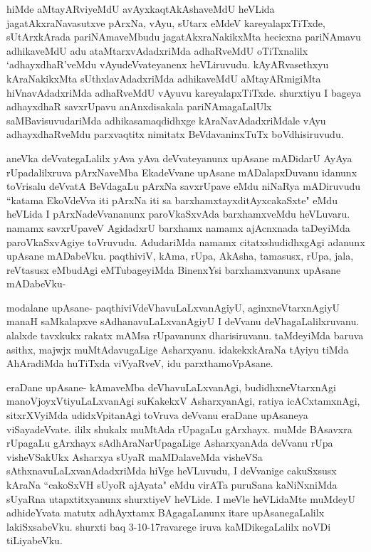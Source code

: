 \begin{artha}
hiMde aMtayARviyeMdU avAyxkaqtAkAshaveMdU heVLida jagatAkxraNavasutxve pArxNa, vAyu, sUtarx eMdeV kareyalapxTiTxde, sUtArxkArada pariNAmaveMbudu jagatAkxraNakikxMta hecicxna pariNAmavu adhikaveMdU adu ataMtarxvAdadxriMda adhaRveMdU oTiTxnalilx `adhayxdhaR'veMdu vAyudeVvateyanenx heVLiruvudu. kAyARvasethxyu kAraNakikxMta sUthxlavAdadxriMda adhikaveMdU aMtayARmigiMta hiVnavAdadxriMda adhaRveMdU vAyuvu kareyalapxTiTxde. shurxtiyu I bageya adhayxdhaR savxrUpavu anAnxdisakala pariNAmagaLalUlx saMBavisuvudariMda adhikasamaqdidhxge kAraNavAdadxriMdale vAyu adhayxdhaRveMdu parxvaqtitx nimitatx BeVdavaninxTuTx boVdhisiruvudu. 
\end{artha}

\begin{artha}
aneVka deVvategaLalilx yAva yAva deVvateyanunx upAsane mADidarU AyAya rUpadalilxruva pArxNaveMba EkadeVvane upAsane mADalapxDuvanu idanunx toVrisalu deVvatA BeVdagaLu pArxNa savxrUpave eMdu niNaRya mADiruvudu ``katama EkoVdeVva iti pArxNa iti sa barxhamxtayxditAyxcakaSxte" eMdu heVLida I pArxNadeVvananunx paroVkaSxvAda barxhamxveMdu heVLuvaru. namamx savxrUpaveV AgidadxrU barxhamx namamx ajAcnxnada taDeyiMda paroVkaSxvAgiye toVruvudu. AdudariMda namamx citatxshudidhxgAgi adanunx upAsane mADabeVku. paqthiviV, kAma, rUpa, AkAsha, tamasusx, rUpa, jala, reVtasusx eMbudAgi eMTubageyiMda BinenxYsi barxhamxvanunx upAsane mADabeVku-
\end{artha}

\begin{artha}
modalane upAsane- paqthiviVdeVhavuLaLxvanAgiyU, aginxneVtarxnAgiyU manaH saMkalapxve sAdhanavuLaLxvanAgiyU I deVvanu deVhagaLalilxruvanu. alalxde tavxkukx rakatx mAMsa rUpavanunx dharisiruvanu. taMdeyiMda baruva asithx, majwjx muMtAdavugaLige Asharxyanu. idakekxkAraNa tAyiyu tiMda AhAradiMda huTiTxda viVyaRveV, idu parxthamoVpAsane. 
\end{artha}

\begin{artha}
eraDane upAsane- kAmaveMba deVhavuLaLxvanAgi, budidhxneVtarxnAgi manoVjoyxVtiyuLaLxvanAgi suKakekxV AsharxyanAgi, ratiya icACxtamxnAgi, sitxrXVyiMda udidxVpitanAgi toVruva deVvanu eraDane upAsaneya viSayadeVvate. ililx shukalx muMtAda rUpagaLu gArxhayx. muMde BAsavxra rUpagaLu gArxhayx sAdhAraNarUpagaLige AsharxyanAda deVvanu rUpa visheVSakUkx Asharxya sUyaR maMDalaveMda visheVSa sAthxnavuLaLxvanAdadxriMda hiVge heVLuvudu, I deVvanige cakuSxsusx kAraNa ``cakoSxVH sUyoR ajAyata" eMdu virATa puruSana kaNiNxniMda sUyaRna utapxtitxyanunx shurxtiyeV heVLide. I meVle heVLidaMte muMdeyU adhideYvata matutx adhAyxtamx BAgagaLanunx itare upAsanegaLalilx lakiSxsabeVku. shurxti baq 3-10-17ravarege iruva kaMDikegaLalilx noVDi tiLiyabeVku.
\end{artha}

